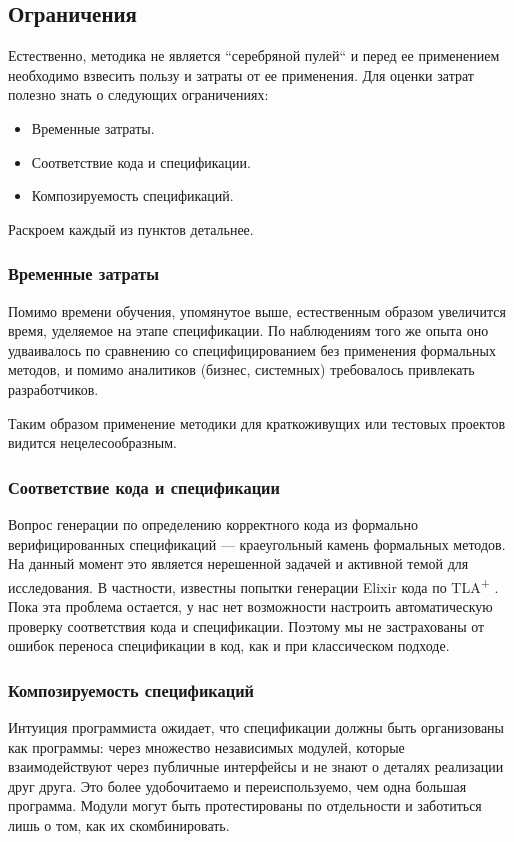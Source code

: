 \documentclass[14pt, openany]{report}
\newcommand{\tlapl}{TLA\textsuperscript{+} }
\begin{document}
\subsection{Ограничения}
Естественно, методика не является ``серебряной пулей`` и перед ее применением необходимо взвесить пользу и затраты от ее применения. Для оценки затрат полезно знать о следующих ограничениях:
\begin{itemize}
  \item Временные затраты.
  \item Соответствие кода и спецификации.
  \item Композируемость спецификаций.
\end{itemize}

Раскроем каждый из пунктов детальнее.


\subsubsection{Временные затраты}
Помимо времени обучения, упомянутое выше, естественным образом увеличится время, уделяемое на этапе спецификации. По наблюдениям того же опыта оно удваивалось по сравнению со специфицированием без применения формальных методов, и помимо аналитиков (бизнес, системных) требовалось привлекать разработчиков.

Таким образом применение методики для краткоживущих или тестовых проектов видится нецелесообразным.

\subsubsection{Соответствие кода и спецификации}
Вопрос генерации по определению корректного кода из формально верифицированных спецификаций --- краеугольный камень формальных методов. На данный момент это является нерешенной задачей и активной темой для исследования. В частности, известны попытки генерации Elixir кода по \tlapl \cite{tlaElixir}. Пока эта проблема остается, у нас нет возможности настроить автоматическую проверку соответствия кода и спецификации. Поэтому мы не застрахованы от ошибок переноса спецификации в код, как и при классическом подходе.

\subsubsection{Композируемость спецификаций}
Интуиция программиста ожидает, что спецификации должны быть организованы как программы: через множество независимых модулей, которые взаимодействуют через публичные интерфейсы и не знают о деталях реализации друг друга. Это более удобочитаемо и переиспользуемо, чем одна большая программа. Модули могут быть протестированы по отдельности и заботиться лишь о том, как их скомбинировать. 
\end{document}
